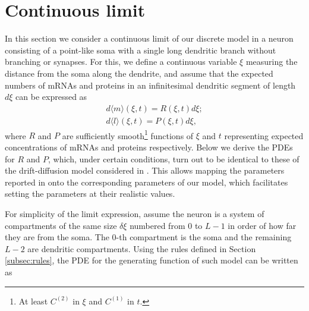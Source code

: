 \documentclass[a4paper, 11pt]{article}
\begin{document}
\section{Continuous limit}
In this section we consider a continuous limit of our discrete model in a neuron consisting of a point-like soma with a single long dendritic branch without branching or synapses. For this, we define a continuous variable $\xi$ measuring the distance from the soma along the dendrite, and assume that the expected numbers of mRNAs and proteins in an infinitesimal dendritic segment of length $d\xi$ can be expressed as
\begin{align*}
  d\langle m\rangle (\xi,t) = R(\xi,t)d\xi;\\
  d\langle l\rangle (\xi,t) = P(\xi,t)d\xi,
\end{align*}
where $R$ and $P$ are sufficiently smooth\footnote{At least $C^{(2)}$ in $\xi$ and $C^{(1)}$ in $t$.} functions of $\xi$ and $t$ representing expected concentrations of mRNAs and proteins respectively. Below we derive the PDEs for $R$ and $P$, which, under certain conditions, turn out to be identical to these of the drift-diffusion model considered in \cite{PMID:31350097}. This allows mapping the parameters reported in \cite{PMID:31350097} onto the corresponding parameters of our model, which facilitates setting the parameters at their realistic values.



For simplicity of the limit expression, assume the neuron is a system of compartments of the same size $\delta\xi$ numbered from $0$ to $L-1$ in order of how far they are from the soma. The 0-th compartment is the soma and the remaining $L-2$ are dendritic compartments. Using the rules defined in Section \ref{subsec:rules}, the PDE for the generating function of such model can be written as
\end{document}
